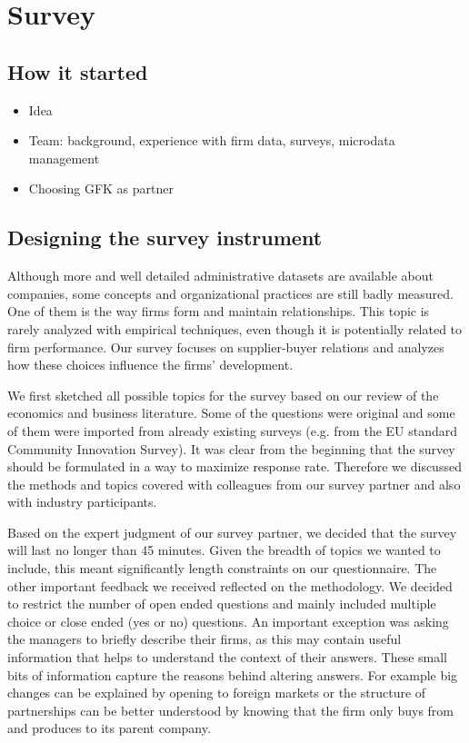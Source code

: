 \documentclass[final, dvipsnames, authoryear,12pt]{elsarticle}
\begin{document}
\section{ Survey}
\subsection{How it started}


\begin{itemize}
    \item Idea
    \item Team: background, experience with firm data, surveys, microdata management
    \item Choosing GFK as partner
\end{itemize}{}


\subsection{Designing the survey instrument}

Although more and well detailed administrative datasets are available about companies, some concepts and organizational practices are still badly measured.\cite{Bloom2014-hc} One of them is the way firms form and maintain relationships. This topic is rarely analyzed with empirical techniques, even though it is potentially related to firm performance. Our survey focuses on supplier-buyer relations and analyzes how these choices influence the firms’ development.

We first sketched all possible topics for the survey based on our review of the economics and business literature. 
Some of the questions were original and some of them were imported from already existing surveys (e.g. from the EU standard Community Innovation Survey). It was clear from the beginning that the survey should be formulated in a way to maximize response rate. Therefore we discussed the methods and topics covered with colleagues from our survey partner and also with industry participants.

Based on the expert judgment of our survey partner, we decided that the survey will last no longer than 45 minutes. Given the breadth of topics we wanted to include, this meant significantly length constraints on our questionnaire. The other important feedback we received reflected on the methodology. We decided to restrict the number of open ended questions and mainly included multiple choice or close ended (yes or no) questions. An important exception was asking the managers to briefly describe their firms, as this may contain useful information that helps to understand the context of their answers. These small bits of information capture the reasons behind altering answers. For example big changes can be explained by opening to foreign markets or the structure of partnerships can be better understood by knowing that the firm only buys from and produces to its parent company.
\end{document}
